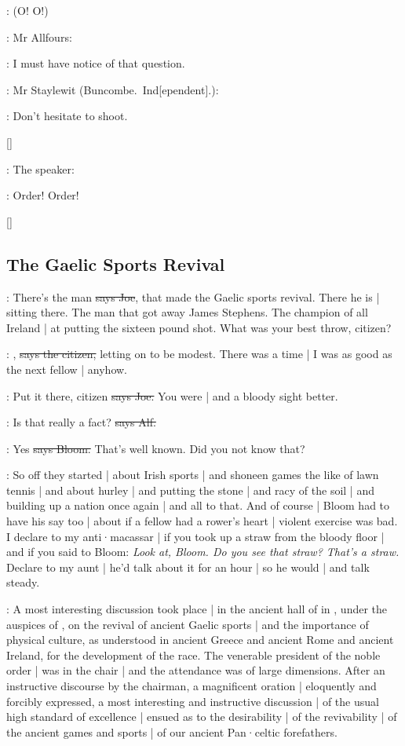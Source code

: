 \All:
(O!
O!)

:
Mr Allfours:

\allfours:
I must have notice of that question.

:
Mr Staylewit
(Buncombe.~Ind[ependent].):

\staylewit:
Don't hesitate to shoot.

[]

:
The speaker:

\Speaker:
Order!
Order!

[]


\subsection*{The Gaelic Sports Revival}

\joe:
There's the man
\sout{says Joe},
that made the Gaelic sports revival.
There he is |
sitting there.
The man that got away James Stephens.
The champion of all Ireland |
at putting the sixteen pound shot.
What was your best throw,
citizen?

\citizen:
,
\sout{says the citizen,}
letting on to be modest.
There was a time |
I was as good as the next fellow |
anyhow.

\joe:
Put it there,
citizen
\sout{says Joe.}
You were |
and a bloody sight better.

\bergan:
Is that really a fact?
\sout{says Alf.}

\Bloom:
Yes
\sout{says Bloom.}
That's well known.
Did you not know that?

\Nq:
So off they started |
about Irish sports |
and shoneen games the like of lawn tennis |
and about hurley
 |
and putting the stone |
and racy of the soil |
and building up a nation once again |
and all to that.
And of course |
Bloom had to have his say too |
about if a fellow had a rower's heart |
violent exercise was bad.
I declare to my anti·macassar |
if you took up a straw from the bloody floor |
and if you said to Bloom:
\emph{Look at,
Bloom.
Do you see that straw?
That's a straw.}
Declare to my aunt |
he'd talk about it for an hour |
so he would |
and talk steady.

:
A most interesting discussion took place |
in the ancient hall of
in ,
under the auspices of ,
on the revival of ancient Gaelic sports |
and the importance of physical culture,
as understood in ancient Greece and ancient Rome and ancient Ireland,
for the development of the race.
The venerable president of the noble order |
was in the chair |
and the attendance was of large dimensions.
After an instructive discourse by the chairman,
a magnificent oration |
eloquently and forcibly expressed,
a most interesting and instructive discussion |
of the usual high standard of excellence |
ensued as to the desirability |
of the revivability |
of the ancient games and sports |
of our ancient Pan·celtic forefathers.

